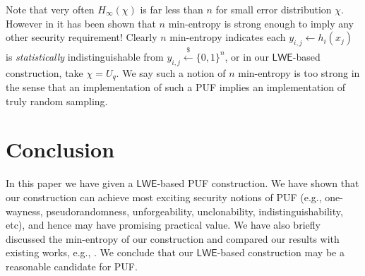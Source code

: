 \documentclass[12pt]{article}
\newcommand{\bits}{\{0,1\}}
\newcommand{\getsr}{\stackrel{\$}{\gets}}
\newcommand{\LWE}{\mathsf{LWE}}
\theoremstyle{definition}
\begin{document}
Note that very often $H_{\infty}(\chi)$ is far less than $n$ for small error distribution $\chi$. However in \cite{sadeghi2016towards} it has been shown that $n$ min-entropy is strong enough to imply any other security requirement! Clearly $n$ min-entropy indicates each $y_{i,j} \gets h_i(x_j)$ is \emph{statistically} indistinguishable from $y_{i,j} \getsr \bits^n$, or in our $\LWE$-based construction, take $\chi = U_q$. We say such a notion of $n$ min-entropy is too strong in the sense that an implementation of such a PUF implies an implementation of truly random sampling.

\section{Conclusion}
In this paper we have given a $\LWE$-based PUF construction. We have shown that our construction can achieve most exciting security notions of PUF (e.g., one-wayness, pseudorandomness, unforgeability, unclonability, indistinguishability, etc), and hence may have promising practical value. We have also briefly discussed the min-entropy of our construction and compared our results with existing works, e.g., \cite{sadeghi2016towards}. We conclude that our $\LWE$-based construction may be a reasonable candidate for PUF.



	
\end{document}

